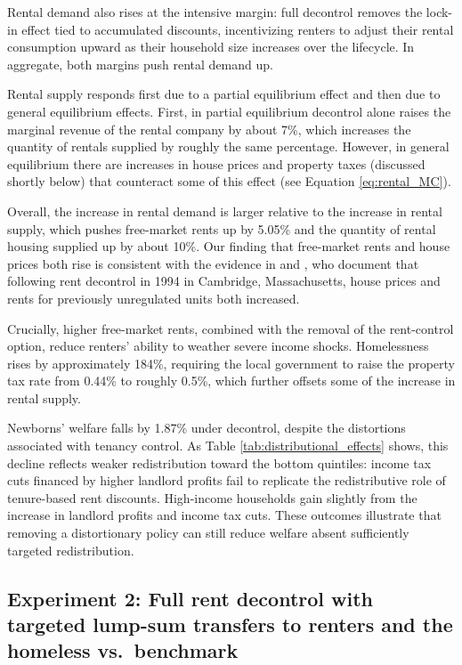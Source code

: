 \documentclass[parskip=full]{article}
\begin{document}
Rental demand also rises at the intensive margin: full decontrol removes the lock-in effect tied to accumulated discounts, incentivizing renters to adjust their rental consumption upward as their household size increases over the lifecycle. In aggregate, both margins push rental demand up. 

Rental supply responds first due to a partial equilibrium effect and then due to general equilibrium effects. First, in partial equilibrium decontrol alone raises the marginal revenue of the rental company by about 7\%, which increases the quantity of rentals supplied by roughly the same percentage. However, in general equilibrium there are increases in house prices and property taxes (discussed shortly below) that counteract some of this effect (see Equation \eqref{eq:rental_MC}). 

Overall, the increase in rental demand is larger relative to the increase in rental supply, which pushes free-market rents up by 5.05\% and the quantity of rental housing supplied up by about 10\%. Our finding that free-market rents and house prices both rise is consistent with the evidence in \citet{sims-2007} and \citet{app-2014}, who document that following rent decontrol in 1994 in Cambridge, Massachusetts, house prices and rents for previously unregulated units both increased.

Crucially, higher free-market rents, combined with the removal of the rent-control option, reduce renters' ability to weather severe income shocks. Homelessness rises by approximately 184\%, requiring the local government to raise the property tax rate from 0.44\% to roughly 0.5\%, which further offsets some of the increase in rental supply.

Newborns' welfare falls by 1.87\% under decontrol, despite the distortions associated with tenancy control. As Table \ref{tab:distributional_effects} shows, this decline reflects weaker redistribution toward the bottom quintiles: income tax cuts financed by higher landlord profits fail to replicate the redistributive role of tenure-based rent discounts. High-income households gain slightly from the increase in landlord profits and income tax cuts. These outcomes illustrate that removing a distortionary policy can still reduce welfare absent sufficiently targeted redistribution.

\subsection{Experiment 2: Full rent decontrol with targeted lump-sum transfers to renters and the homeless vs.\ benchmark}\label{sec:exp_2}
\end{document}
